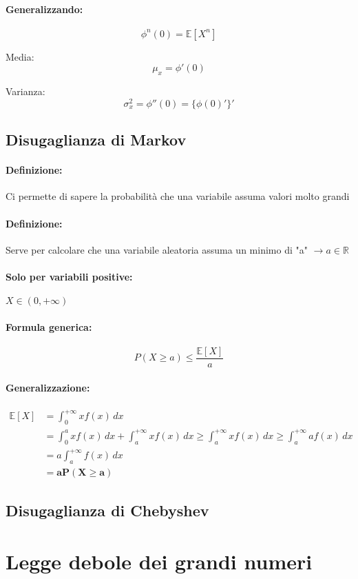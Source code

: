 \documentclass[]{article}
\newcommand{\ev}{\mathbb{E}[X]}
\renewcommand{\ev}[1]{\mathbb{E}[#1]}
\newcommand{\definizione}{\paragraph{Definizione:}}
\newcommand{\formula}{\paragraph{Formula generica:}}
\begin{document}
    \paragraph{Generalizzando:}
    \[ \phi^{n}(0) = \ev{X^n} \]
    \linebreak[2]

    \begin{minipage}{0.45\linewidth}
        Media:
        \[\mu_x = \phi'(0)\]
    \end{minipage}
    \hfill
    \begin{minipage}{0.45\linewidth}
        Varianza:
        \[ \sigma^{2}_x = \phi''(0) = \{\phi(0)'\}' \]
    \end{minipage}
    \subsection{Disugaglianza di Markov}
    \definizione Ci permette di sapere la probabilità che una variabile assuma valori molto grandi
    \definizione Serve per calcolare che una variabile aleatoria assuma un minimo di "a" $\longrightarrow a \in \mathbb{R}$
    \paragraph{Solo per variabili positive:} $X \in (0, +\infty) $
    \formula \[ P(X \geq a) \leq \frac{\ev{X}}{a}\]

    \paragraph{Generalizzazione:}
    \begin{equation*}
        \begin{split}
            \ev{X} & = \int_{0}^{+\infty} xf(x) \, dx \\
            & = \int_{0}^{a} x f(x) \, dx + \int_{a}^{+\infty} x f(x) \, dx \geq \int_{a}^{+\infty} x f(x) \, dx \geq \int_{a}^{+\infty} a f(x) \, dx \\
            & = a \int_{a}^{+\infty} f(x) \, dx \\ 
            & = \boldsymbol{aP(X \geq a)}
        \end{split}
    \end{equation*}
    
    \subsection{Disugaglianza di Chebyshev}

    \section{Legge debole dei grandi numeri}
\end{document}
